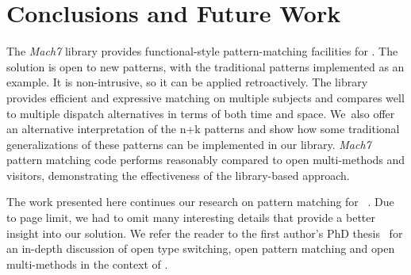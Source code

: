 \section{Conclusions and Future Work} %
\label{sec:cc}

The \emph{Mach7} library provides functional-style 
pattern-matching facilities for \Cpp{}. The solution is open to new patterns, 
with the traditional patterns implemented as an example. It is
non-intrusive, so it can be applied retroactively. %
The library provides efficient and expressive matching on multiple subjects and 
compares well to multiple dispatch alternatives in terms of both time and space.
We~also offer an alternative interpretation of the n+k patterns and show how some 
traditional generalizations of these patterns can be implemented in our library. 
%
%
%
\emph{Mach7} pattern matching code performs reasonably compared to
open multi-methods and visitors, demonstrating the effectiveness of the 
library-based approach.

The work presented here continues our research on pattern matching for 
\Cpp{}~\cite{TS12}. Due to page limit, we had to omit many interesting 
details that provide a better insight into our solution. We refer the reader to 
the first author's PhD thesis~\cite{SolodkyyThesis} for an in-depth discussion 
of open type switching, open pattern matching and open multi-methods in the 
context of \Cpp{}.

